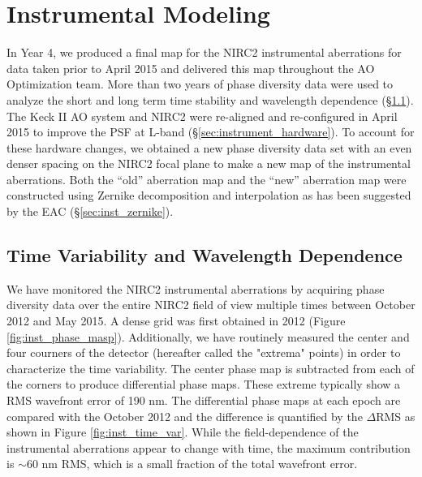 \section{Instrumental Modeling}
\label{sec:instrument}

In Year 4, we produced a final map for the NIRC2 instrumental
aberrations for data taken prior to April 2015 and delivered this map
throughout the AO Optimization team. More than two years of
phase diversity data were used to analyze the short and long term time
stability and wavelength dependence (\S\ref{sec:instrument_time}).
The Keck \textrm{II} AO system and NIRC2 were re-aligned and
re-configured in April 2015 to improve the PSF at L-band
(\S\ref{sec:instrument_hardware}). To account for these hardware changes, we 
obtained a new phase diversity data set with an even denser spacing on
the NIRC2 focal plane to make a new map of the instrumental
aberrations.
Both the ``old'' aberration map and the ``new'' aberration map were
constructed using Zernike decomposition and interpolation as has been
suggested by the EAC (\S\ref{sec:inst_zernike}).

\subsection{Time Variability and Wavelength Dependence}
\label{sec:instrument_time}

We have monitored the NIRC2 instrumental aberrations by 
acquiring phase diversity data over the entire NIRC2 field of view
multiple times between October 2012 and May 2015. 
A dense grid was first obtained in 2012 (Figure \ref{fig:inst_phase_masp}). 
Additionally, we have routinely measured the center and four courners
of the detector
(hereafter called the "extrema" points) in order to characterize the
time variability. The center phase map is subtracted from each of the
corners to produce differential phase maps. These extreme typically
show a RMS wavefront error of 190 nm. The differential phase
maps at each epoch are compared with the October 2012 and the
difference is quantified by the $\Delta$RMS as shown in Figure
\ref{fig:inst_time_var}. 
While the field-dependence of the instrumental aberrations appear to
change with time, the maximum contribution is $\sim$60 nm RMS, which
is a small fraction of the total wavefront error. 
    
    
    
  
  
  
  
  
  